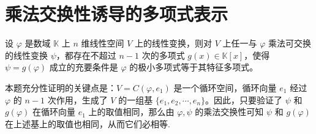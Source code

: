 \documentclass[../../main.tex]{subfiles}%
\begin{document}
\section{乘法交换性诱导的多项式表示}

\begin{theorem}\label{theorem:极小多项式等于特征多项式的充要条件}
设 $\varphi$ 是数域 $\mathbb{K}$ 上 $n$ 维线性空间 $V$ 上的线性变换，则对 $V$ 上任一与 $\varphi$ 乘法可交换的线性变换 $\psi$，都存在不超过 $n - 1$ 次的多项式 $g(x)\in\mathbb{K}[x]$，使得 $\psi = g(\varphi)$ 成立的充要条件是 $\varphi$ 的极小多项式等于其特征多项式。
\end{theorem}
\begin{remark}
本题充分性证明的关键点是：$V = C(\varphi,e_1)$ 是一个循环空间，循环向量 $e_1$ 经过 $\varphi$ 的 $n - 1$ 次作用，生成了 $V$ 的一组基 $\{e_1,e_2,\cdots,e_n\}$。因此，只要验证了 $\psi$ 和 $g(\varphi)$ 在循环向量 $e_1$ 上的取值相同，那么由 $\varphi,\psi$ 的乘法交换性可知 $\psi$ 和 $g(\varphi)$ 在上述基上的取值也相同，从而它们必相等.
\end{remark}
\end{document}
